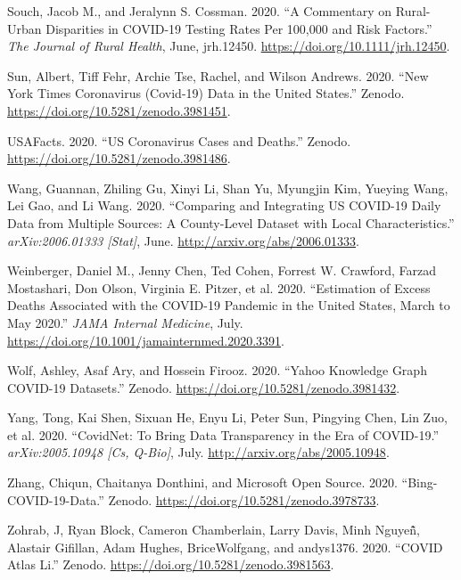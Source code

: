 \documentclass[10pt,letterpaper]{article}
\newlength{\cslhangindent}
\newenvironment{cslreferences}%
  {\setlength{\parindent}{0pt}%
  \everypar{\setlength{\hangindent}{\cslhangindent}}\ignorespaces}%
  {\par}
\begin{document}
\begin{cslreferences}
\leavevmode\hypertarget{ref-souchCommentaryRuralUrban2020}{}%
Souch, Jacob M., and Jeralynn S. Cossman. 2020. ``A Commentary on
Rural-Urban Disparities in COVID-19 Testing Rates Per 100,000 and Risk
Factors.'' \emph{The Journal of Rural Health}, June, jrh.12450.
\url{https://doi.org/10.1111/jrh.12450}.

\leavevmode\hypertarget{ref-albertsunNewYorkTimes2020}{}%
Sun, Albert, Tiff Fehr, Archie Tse, Rachel, and Wilson Andrews. 2020.
``New York Times Coronavirus (Covid-19) Data in the United States.''
Zenodo. \url{https://doi.org/10.5281/zenodo.3981451}.

\leavevmode\hypertarget{ref-usafactsUSCoronavirusCases2020}{}%
USAFacts. 2020. ``US Coronavirus Cases and Deaths.'' Zenodo.
\url{https://doi.org/10.5281/zenodo.3981486}.

\leavevmode\hypertarget{ref-wangComparingIntegratingUS2020}{}%
Wang, Guannan, Zhiling Gu, Xinyi Li, Shan Yu, Myungjin Kim, Yueying
Wang, Lei Gao, and Li Wang. 2020. ``Comparing and Integrating US
COVID-19 Daily Data from Multiple Sources: A County-Level Dataset with
Local Characteristics.'' \emph{arXiv:2006.01333 {[}Stat{]}}, June.
\url{http://arxiv.org/abs/2006.01333}.

\leavevmode\hypertarget{ref-weinbergerEstimationExcessDeaths2020}{}%
Weinberger, Daniel M., Jenny Chen, Ted Cohen, Forrest W. Crawford,
Farzad Mostashari, Don Olson, Virginia E. Pitzer, et al. 2020.
``Estimation of Excess Deaths Associated with the COVID-19 Pandemic in
the United States, March to May 2020.'' \emph{JAMA Internal Medicine},
July. \url{https://doi.org/10.1001/jamainternmed.2020.3391}.

\leavevmode\hypertarget{ref-ashleywolfYahooKnowledgeGraph2020}{}%
Wolf, Ashley, Asaf Ary, and Hossein Firooz. 2020. ``Yahoo Knowledge
Graph COVID-19 Datasets.'' Zenodo.
\url{https://doi.org/10.5281/zenodo.3981432}.

\leavevmode\hypertarget{ref-yangCovidNetBringData2020}{}%
Yang, Tong, Kai Shen, Sixuan He, Enyu Li, Peter Sun, Pingying Chen, Lin
Zuo, et al. 2020. ``CovidNet: To Bring Data Transparency in the Era of
COVID-19.'' \emph{arXiv:2005.10948 {[}Cs, Q-Bio{]}}, July.
\url{http://arxiv.org/abs/2005.10948}.

\leavevmode\hypertarget{ref-chiqunzhangBingCOVID19Data2020}{}%
Zhang, Chiqun, Chaitanya Donthini, and Microsoft Open Source. 2020.
``Bing-COVID-19-Data.'' Zenodo.
\url{https://doi.org/10.5281/zenodo.3978733}.

\leavevmode\hypertarget{ref-jzohrabCOVIDAtlasLi2020}{}%
Zohrab, J, Ryan Block, Cameron Chamberlain, Larry Davis, Minh Nguyeñ̂,
Alastair Gifillan, Adam Hughes, BriceWolfgang, and andys1376. 2020.
``COVID Atlas Li.'' Zenodo.
\url{https://doi.org/10.5281/zenodo.3981563}.
\end{cslreferences}

\nolinenumbers
\end{document}
